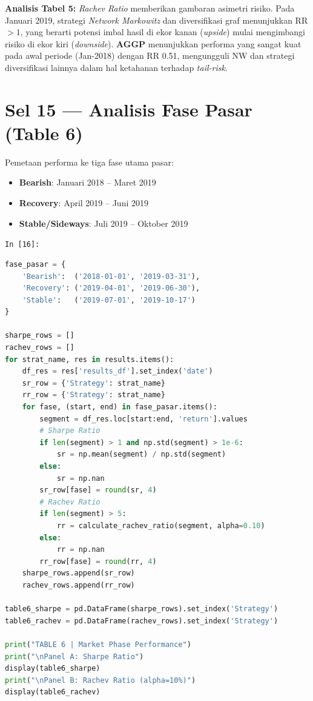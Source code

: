 \documentclass[12pt,a4paper]{article}
\newcommand{\cellIn}[1]{%
  \begin{tcolorbox}[cellheader]
    \texttt{In [#1]:}
  \end{tcolorbox}\vspace{-6pt}%
}
\begin{document}
\textbf{Analisis Tabel 5:} \textit{Rachev Ratio} memberikan gambaran asimetri risiko. Pada Januari 2019, strategi \textit{Network Markowitz} dan diversifikasi graf menunjukkan RR $> 1$, yang berarti potensi imbal hasil di ekor kanan (\textit{upside}) mulai mengimbangi risiko di ekor kiri (\textit{downside}). \textbf{AGGP} menunjukkan performa yang sangat kuat pada awal periode (Jan-2018) dengan RR 0.51, mengungguli NW dan strategi diversifikasi lainnya dalam hal ketahanan terhadap \textit{tail-risk}.

\section{Sel 15 --- Analisis Fase Pasar (Table 6)}

Pemetaan performa ke tiga fase utama pasar:

\begin{itemize}
  \item \textbf{Bearish}: Januari 2018 -- Maret 2019
  \item \textbf{Recovery}: April 2019 -- Juni 2019
  \item \textbf{Stable/Sideways}: Juli 2019 -- Oktober 2019
\end{itemize}

\cellIn{16}
\begin{tcolorbox}[codebox]
\begin{lstlisting}[language=Python, numbers=none]
fase_pasar = {
    'Bearish':  ('2018-01-01', '2019-03-31'),
    'Recovery': ('2019-04-01', '2019-06-30'),
    'Stable':   ('2019-07-01', '2019-10-17')
}

sharpe_rows = []
rachev_rows = []
for strat_name, res in results.items():
    df_res = res['results_df'].set_index('date')
    sr_row = {'Strategy': strat_name}
    rr_row = {'Strategy': strat_name}
    for fase, (start, end) in fase_pasar.items():
        segment = df_res.loc[start:end, 'return'].values
        # Sharpe Ratio
        if len(segment) > 1 and np.std(segment) > 1e-6:
            sr = np.mean(segment) / np.std(segment)
        else:
            sr = np.nan
        sr_row[fase] = round(sr, 4)
        # Rachev Ratio
        if len(segment) > 5:
            rr = calculate_rachev_ratio(segment, alpha=0.10)
        else:
            rr = np.nan
        rr_row[fase] = round(rr, 4)
    sharpe_rows.append(sr_row)
    rachev_rows.append(rr_row)

table6_sharpe = pd.DataFrame(sharpe_rows).set_index('Strategy')
table6_rachev = pd.DataFrame(rachev_rows).set_index('Strategy')

print("TABLE 6 | Market Phase Performance")
print("\nPanel A: Sharpe Ratio")
display(table6_sharpe)
print("\nPanel B: Rachev Ratio (alpha=10%)")
display(table6_rachev)
\end{lstlisting}
\end{tcolorbox}
\end{document}
